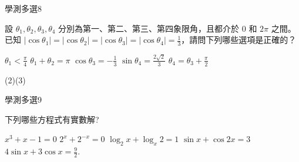 \begin{QUESTIONS}
    \begin{QUESTION}
        \begin{ExamInfo}{99}{學測}{多選}{8}
        \end{ExamInfo}
        \begin{ExamAnsRateInfo}{39}{72}{29}{16}
        \end{ExamAnsRateInfo}
        \begin{QBODY}
            設 $\theta_1,\theta_2,\theta_3,\theta_4$ 分別為第一、第二、第三、第四象限角，且都介於 $0$ 和  $2\pi$ 之間。已知 $|\cos \theta_{1}| =|\cos \theta_{2}| =|\cos \theta_{3}| =|\cos \theta_{4}| =\frac{1}{3}$，請問下列哪些選項是正確的？
			\begin{QOPS} 
				\QOP $\theta_{1} < \frac{\pi}{4}$ 
				\QOP $\theta_{1} + \theta_{2} = \pi$
				\QOP $ \cos \theta_{3}  =-\frac{1}{3}$ 
				\QOP $\sin\theta_{4} = \frac{2\sqrt{2}}{3}$
				\QOP $\theta_{4} = \theta_{3} + \frac{\pi}{2}$ 
			\end{QOPS}
        \end{QBODY}
        \begin{QFROMS}
        \end{QFROMS}
        \begin{QTAGS}\end{QTAGS}
        \begin{QANS}
            (2)(3)
        \end{QANS}
        \begin{QSOLLIST}
        \end{QSOLLIST}
        \begin{QEMPTYSPACE}
        \end{QEMPTYSPACE}
    \end{QUESTION}
    \begin{QUESTION}
        \begin{ExamInfo}{99}{學測}{多選}{9}
        \end{ExamInfo}
        \begin{ExamAnsRateInfo}{24}{50}{14}{8}
        \end{ExamAnsRateInfo}
        \begin{QBODY}
            下列哪些方程式有實數解?
			\begin{QOPS} 
				\QOP $x^3 +x -1=0$ 
				\QOP $2^x +2^{-x} =0$ 
				\QOP $\log_2 x+ \log_x 2=1$ 
				\QOP $\sin{x}+ \cos{2x}=3$
				\QOP $4\sin{x}+3\cos{x}=\frac{9}{2}$.
			\end{QOPS}

\end{QBODY}
\end{QUESTION}
\end{QUESTIONS}
